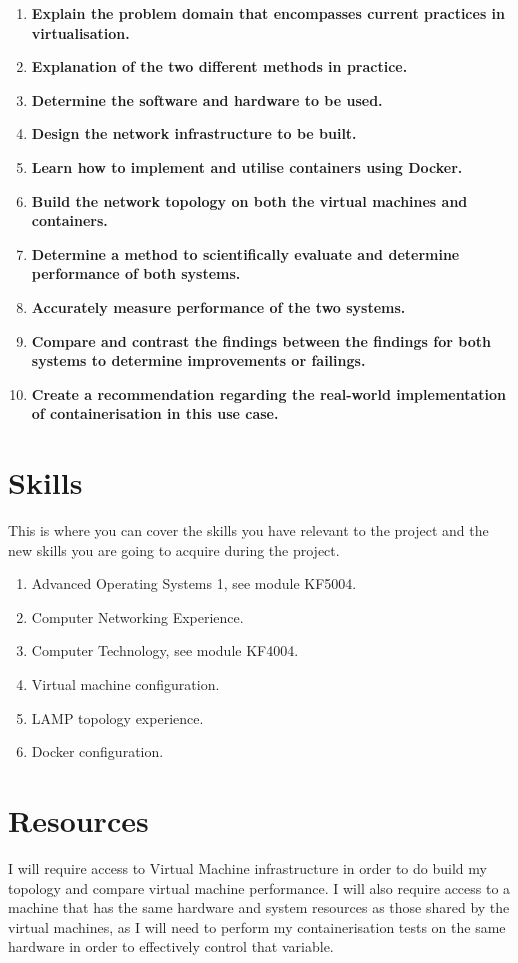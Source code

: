 \begin{enumerate}
	\item \textbf{Explain the problem domain that encompasses current practices in virtualisation.}
	\item \textbf{Explanation of the two different methods in practice.}
	\item \textbf{Determine the software and hardware to be used.}
	\item \textbf{Design the network infrastructure to be built.}
	\item \textbf{Learn how to implement and utilise containers using Docker.}
	\item \textbf{Build the network topology on both the virtual machines and containers.}
	\item \textbf{Determine a method to scientifically evaluate and determine performance of both systems.}
	\item \textbf{Accurately measure performance of the two systems.}
	\item \textbf{Compare and contrast the findings between the findings for both systems to determine improvements or failings.}
	\item \textbf{Create a recommendation regarding the real-world implementation of containerisation in this use case.}

\end{enumerate}

\section{Skills}
This is where you can cover the skills you have relevant to the project and the new skills you are going to acquire during the project.
\begin{enumerate}
	\item Advanced Operating Systems 1, see module KF5004.
	\item Computer Networking Experience.
	\item Computer Technology, see module KF4004.
	\item Virtual machine configuration.
	\item LAMP topology experience.
	\item Docker configuration.
\end{enumerate}

\section{Resources}
I will require access to Virtual Machine infrastructure in order to do build my topology and compare virtual machine performance.
I will also require access to a machine that has the same hardware and system resources as those shared by the virtual machines, as I will need to perform my containerisation tests on the same hardware in order to effectively control that variable.

